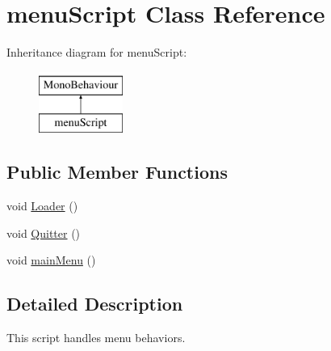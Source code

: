 \hypertarget{classmenu_script}{\section{menu\-Script Class Reference}
\label{classmenu_script}
}
Inheritance diagram for menu\-Script\-:\begin{figure}[H]
\begin{center}
\leavevmode
\includegraphics[height=2.000000cm]{classmenu_script}
\end{center}
\end{figure}
\subsection*{Public Member Functions}
\begin{DoxyCompactItemize}
\item 
void \hyperlink{classmenu_script_ad8b1a2b775439cde293c20cf42c383bf}{Loader} ()
\item 
void \hyperlink{classmenu_script_a741eca3b4ba3e4e9dd70a6d871c0fff3}{Quitter} ()
\item 
void \hyperlink{classmenu_script_a138adad9002137957134de29d5240596}{main\-Menu} ()
\end{DoxyCompactItemize}


\subsection{Detailed Description}
This script handles menu behaviors. 

